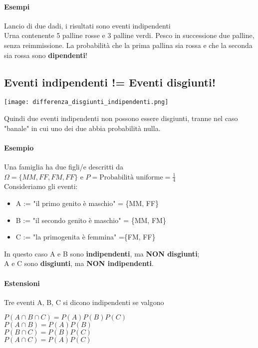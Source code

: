 \paragraph{Esempi}
Lancio di due dadi, i risultati sono eventi indipendenti
\\ Urna contenente 5 palline rosse e 3 palline verdi. Pesco in successione due palline, 
senza reimmissione. La probabilità che la prima pallina sia rossa e che la seconda sia rossa
sono \textbf{dipendenti}!

\subsection{Eventi indipendenti != Eventi disgiunti!}
\begin{center}
    \texttt{[image: differenza\_disgiunti\_indipendenti.png]}
\end{center}
Quindi due eventi indipendenti non possono essere disgiunti,
tranne nel caso "banale" in cui uno dei due abbia probabilità
nulla.

\paragraph*{Esempio} Una famiglia ha due figli/e descritti da 
\\ $\Omega = \{MM, FF, FM, FF\}$ e $P=\text{Probabilità uniforme} = \frac{1}{4}$
\\ Consideriamo gli eventi:
\begin{itemize}
    \item A := "il primo genito è maschio" = \{MM, FF\}
    \item B := "il secondo genito è maschio" = \{MM, FM\}
    \item C := "la primogenita è femmina" =\{FM, FF\}
\end{itemize}
\begin{center}
    In questo caso A e B sono \textbf{indipendenti}, ma \textbf{NON disgiunti};
\\ A e C sono \textbf{disgiunti}, ma \textbf{NON indipendenti}.
\end{center}

\paragraph{Estensioni}
Tre eventi A, B, C si dicono indipendenti se valgono
\begin{center}
    $P(A \cap B \cap C) = P(A)P(B)P(C)$
    \\$P(A \cap B) = P(A)P(B)$
    \\$P(B \cap C) = P(B)P(C)$
    \\$P(A \cap C) = P(A)P(C)$
\end{center}
